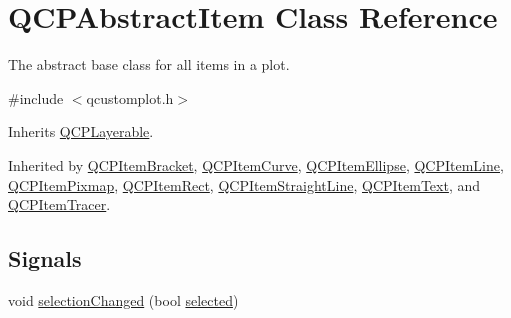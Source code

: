 \hypertarget{class_q_c_p_abstract_item}{\section{Q\-C\-P\-Abstract\-Item Class Reference}
\label{class_q_c_p_abstract_item}
}


The abstract base class for all items in a plot.  




{\ttfamily \#include $<$qcustomplot.\-h$>$}



Inherits \hyperlink{class_q_c_p_layerable}{Q\-C\-P\-Layerable}.



Inherited by \hyperlink{class_q_c_p_item_bracket}{Q\-C\-P\-Item\-Bracket}, \hyperlink{class_q_c_p_item_curve}{Q\-C\-P\-Item\-Curve}, \hyperlink{class_q_c_p_item_ellipse}{Q\-C\-P\-Item\-Ellipse}, \hyperlink{class_q_c_p_item_line}{Q\-C\-P\-Item\-Line}, \hyperlink{class_q_c_p_item_pixmap}{Q\-C\-P\-Item\-Pixmap}, \hyperlink{class_q_c_p_item_rect}{Q\-C\-P\-Item\-Rect}, \hyperlink{class_q_c_p_item_straight_line}{Q\-C\-P\-Item\-Straight\-Line}, \hyperlink{class_q_c_p_item_text}{Q\-C\-P\-Item\-Text}, and \hyperlink{class_q_c_p_item_tracer}{Q\-C\-P\-Item\-Tracer}.

\subsection*{Signals}
\begin{DoxyCompactItemize}
\item 
void \hyperlink{class_q_c_p_abstract_item_aa5cffb034fc65dbb91c77e02c1c14251}{selection\-Changed} (bool \hyperlink{class_q_c_p_abstract_item_a225865808640d8d9a7dd19f09a2e93f2}{selected})
\end{DoxyCompactItemize}
